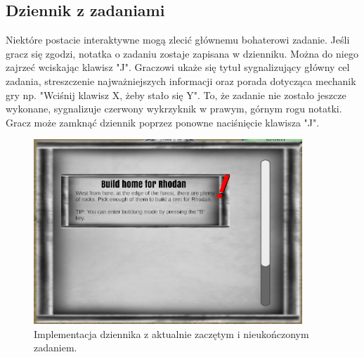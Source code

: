 \subsection{Dziennik z zadaniami}
Niektóre postacie interaktywne mogą zlecić głównemu bohaterowi zadanie. Jeśli gracz się zgodzi, notatka o zadaniu zostaje zapisana w dzienniku. Można do niego zajrzeć
wciskając klawisz "J". Graczowi ukaże się tytuł sygnalizujący główny cel zadania, streszczenie najważniejszych informacji oraz porada dotycząca mechanik gry np. 
"Wciśnij klawisz X, żeby stało się Y". To, że zadanie nie zostało jeszcze wykonane, sygnalizuje czerwony wykrzyknik w prawym, górnym rogu notatki. Gracz może 
zamknąć dziennik poprzez ponowne naciśnięcie klawisza "J".
\begin{figure}[htbp]
    \centering
    \includegraphics[width=0.9\textwidth]{images/ui/journal_quest.png}
    \caption{Implementacja dziennika z aktualnie zaczętym i nieukończonym zadaniem.}\label{fig:end_sc}
\end{figure}
\FloatBarrier

